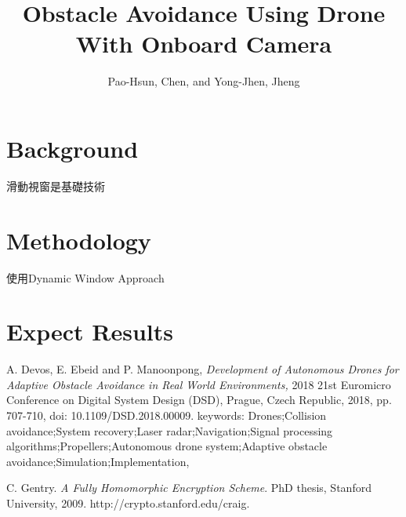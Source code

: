 \documentclass[]{article}
\title{Obstacle Avoidance Using Drone With Onboard Camera}
\author{Pao-Hsun, Chen, and Yong-Jhen, Jheng}
\begin{document}
	
	\maketitle
	
	\section{Background}
     滑動視窗是基礎技術
	\section{Methodology}
	使用Dynamic Window Approach
	\section{Expect Results}
	
	
	\begin{thebibliography}{1}
		
		A. Devos, E. Ebeid and P. Manoonpong, \emph{Development of Autonomous Drones for Adaptive Obstacle Avoidance in Real World Environments,} 2018 21st Euromicro Conference on Digital System Design (DSD), Prague, Czech Republic, 2018, pp. 707-710, doi: 10.1109/DSD.2018.00009. keywords: {Drones;Collision avoidance;System recovery;Laser radar;Navigation;Signal processing algorithms;Propellers;Autonomous drone system;Adaptive obstacle avoidance;Simulation;Implementation},
		
		
		
		C. Gentry. \emph{A Fully Homomorphic Encryption Scheme}. PhD thesis, Stanford University, 2009. http://crypto.stanford.edu/craig.
		
	\end{thebibliography}
	
\end{document}
